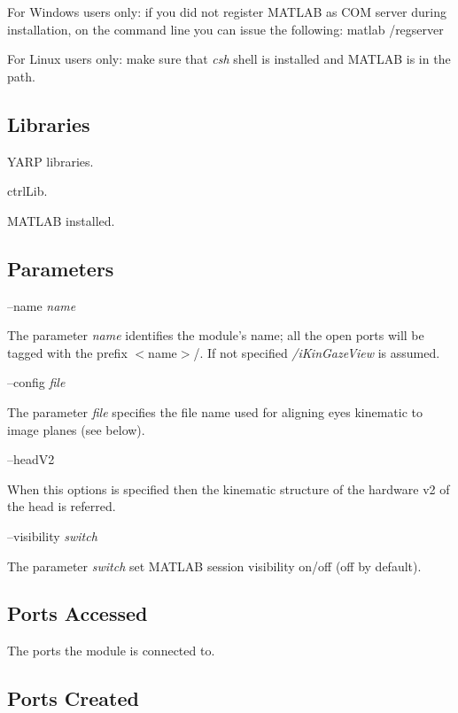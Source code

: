 For Windows users only\+: if you did not register M\+A\+T\+L\+A\+B as C\+O\+M server during installation, on the command line you can issue the following\+: matlab /regserver

For Linux users only\+: make sure that {\itshape csh} shell is installed and M\+A\+T\+L\+A\+B is in the path.\hypertarget{group__icub__tld_lib_sec}{}\subsection{Libraries}\label{group__icub__tld_lib_sec}

\begin{DoxyItemize}
\item Y\+A\+R\+P libraries.
\item ctrl\+Lib.
\item M\+A\+T\+L\+A\+B installed.
\end{DoxyItemize}\hypertarget{group__icub__tld_parameters_sec}{}\subsection{Parameters}\label{group__icub__tld_parameters_sec}
--name {\itshape name} 
\begin{DoxyItemize}
\item The parameter {\itshape name} identifies the module's name; all the open ports will be tagged with the prefix $<$name$>$/. If not specified {\itshape /i\+Kin\+Gaze\+View} is assumed.
\end{DoxyItemize}

--config {\itshape file} 
\begin{DoxyItemize}
\item The parameter {\itshape file} specifies the file name used for aligning eyes kinematic to image planes (see below).
\end{DoxyItemize}

--head\+V2
\begin{DoxyItemize}
\item When this options is specified then the kinematic structure of the hardware v2 of the head is referred.
\end{DoxyItemize}

--visibility {\itshape switch} 
\begin{DoxyItemize}
\item The parameter {\itshape switch} set M\+A\+T\+L\+A\+B session visibility on/off (off by default).
\end{DoxyItemize}\hypertarget{group__signalScope_portsa_sec}{}\subsection{Ports Accessed}\label{group__signalScope_portsa_sec}
The ports the module is connected to.\hypertarget{group__icub__tld_portsc_sec}{}\subsection{Ports Created}\label{group__icub__tld_portsc_sec}

